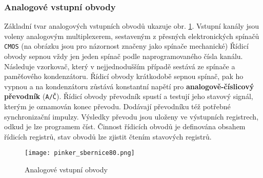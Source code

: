       \subsubsection{Analogové vstupní obvody}
        Základní tvar analogových vstupních obvodů ukazuje obr. \ref{MIT:fig_sbernice80}. Vstupní 
        kanály jsou voleny analogovým multiplexerem, sestaveným z přesných elektronických spínačů 
        \texttt{CMOS} (na  obrázku jsou pro názornost značeny jako spínače mechanické) Řídicí 
        obvody sepnou vždy jen jeden spínač podle naprogramovaného čísla kanálu. Následuje 
        vzorkovač, který v nejjednodušším případě sestává ze spínače a paměťového kondenzátoru. 
        Řídicí obvody krátkodobě sepnou spínač, pak ho vypnou a  na kondenzátoru zůstává konstantní 
        napětí pro \textbf{analogově-číslicový převodník} (\texttt{A/Č}). Řídicí obvody převodník 
        spustí a testují jeho stavový signál, kterým je oznamován konec převodu. Dodávají 
        převodníku též potřebné synchronizační impulzy. Výsledky převodu jsou uloženy ve výstupních 
        registrech, odkud je lze programem číst. Činnost řídicích obvodů je definována obsahem 
        řídicích registrů, stav obvodů lze zjistit čtením stavových registrů.
        \begin{figure}[ht!] %
          \centering
          \texttt{[image: pinker\_sbernice80.png]}
          \caption{Analogové vstupní obvody}
          \label{MIT:fig_sbernice80}
        \end{figure}
        
